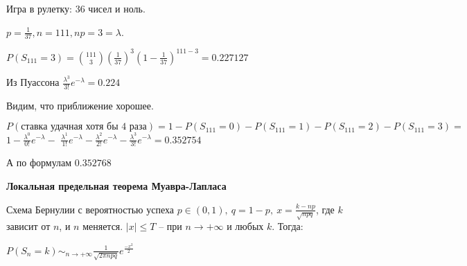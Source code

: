 \begin{example}
    Игра в рулетку: 36 чисел и ноль.

    $p = \frac{1}{37}, n = 111, np = 3 = \lambda$.

    $P(S_{111} = 3) = \binom{111}{3} (\frac{1}{37})^3 (1 - \frac{1}{37})^{111 - 3} = 0.227127$

    Из Пуассона $\frac{\lambda^3}{3!} e^{-\lambda} = 0.224$

    Видим, что приближение хорошее.

    $P(\text{ставка удачная хотя бы 4 раза}) = 1 - P(S_{111} = 0) - P(S_{111} = 1) - P(S_{111} = 2) - P(S_{111} = 3) = $
    $1 - \frac{\lambda^0}{0!}e^{-\lambda} -$
    $\frac{\lambda^1}{1!}e^{-\lambda} - \frac{\lambda^2}{2!}e^{-\lambda} - \frac{\lambda^3}{3!}e^{-\lambda} = 0.352754$

    А по формулам $0.352768$
\end{example}

\begin{theorem}
    \textbf{Локальная предельная теорема Муавра-Лапласа}

    Схема Бернулии с вероятностью успеха $p \in (0, 1), \ q = 1 - p, \ x = \frac{k - np}{\sqrt{npq}}$, где $k$ зависит от $n$, и $n$ меняется. $|x| \leqslant T$ -- при $n \rightarrow +\infty$ и любых $k$. Тогда:

    $P(S_n = k) \sim_{n \to +\infty} \frac{1}{\sqrt{2\pi n p q}} e^{\frac{-x^2}{2}}$

\end{theorem}

